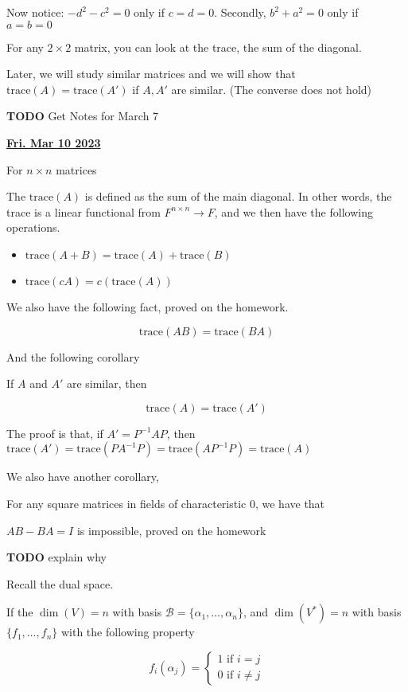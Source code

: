 \documentclass[12pt]{article}
\def\trace{\text{trace}}
\def\B{\mathcal B}
\renewcommand{\date}[1]{\underline{\bf #1}}
\newcommand{\TODO}{\color{red}\textbf{TODO}\color{black}}
\begin{document}
  Now notice: $-d^2 - c^2 = 0$ only if $c = d = 0$. Secondly, $b^2 + a^2 = 0$
  only if $a = b = 0$

  For any $2 \times 2$ matrix, you can look at the trace, the sum of the
  diagonal.

  Later, we will study similar matrices and we will show that $\text{trace}(A) =
  \text{trace}(A')$ if $A, A'$ are similar. (The converse does not hold)

  \TODO{} Get Notes for March 7

  \date{Fri. Mar 10 2023}

  For $n \times n$ matrices

  The $\trace(A)$ is defined as the sum of the main diagonal. In other words,
  the trace is a linear functional from $F^{n \times n} \to F$, and we then have
  the following operations.

  \begin{itemize}
    \item $\trace(A + B) = \trace(A) + \trace(B)$
    \item $\trace(cA) = c(\trace(A))$
  \end{itemize}

  We also have the following fact, proved on the homework.

  \[
    \trace(AB) = \trace(BA)
  \]

  And the following corollary

  If $A$ and $A'$ are similar, then

  \[
    \trace(A) = \trace(A')
  \]

  The proof is that, if $A' = P^{-1} A P$, then $\trace(A') = \trace(P A^{-1} P)
  = \trace(A P^{-1} P) = \trace(A)$

  We also have another corollary,

  For any square matrices in fields of characteristic $0$, we have that

  $AB - BA = I$ is impossible, proved on the homework

  \TODO{} explain why

  Recall the dual space.

  If the $\dim(V) = n$ with basis $\B = \{\alpha_1, \dots, \alpha_n\}$, and
  $\dim(V^*) = n$ with basis $\{f_1, \dots, f_n \}$ with the following property

  \[
    f_i(\alpha_j) = \begin{cases}
      1 \text{ if $i = j$} \\
      0 \text{ if $i \ne j$}
    \end{cases}
  \]
\end{document}
